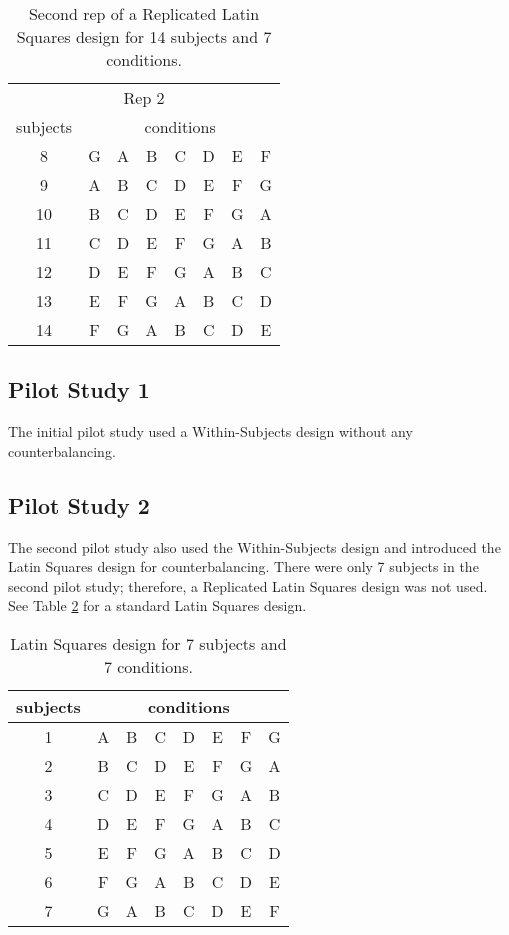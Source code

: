 \begin{table}[h] %
\centering
\caption[Latin Squares Design Rep 2]{\centering Second rep of a Replicated Latin Squares design for 14 subjects and 7 conditions.}
\label{table_latin_squares_rep_2}
\begin{tabular}{c | c c c c c c c}
    \hline
    \multicolumn{8}{c}{Rep 2} \\
    subjects & \multicolumn{7}{c}{conditions} \\
    \hline
    8 & G & A & B & C & D & E & F \\
    9 & A & B & C & D & E & F & G \\
    10 & B & C & D & E & F & G & A \\
    11 & C & D & E & F & G & A & B \\
    12 & D & E & F & G & A & B & C \\
    13 & E & F & G & A & B & C & D \\
    14 & F & G & A & B & C & D & E \\
    \hline
\end{tabular}
\end{table}

\subsection{Pilot Study 1}

The initial pilot study used a Within-Subjects design without any counterbalancing.

\subsection{Pilot Study 2}

The second pilot study also used the Within-Subjects design and introduced the Latin Squares design for counterbalancing. There were only 7 subjects in the second pilot study; therefore, a Replicated Latin Squares design was not used. See Table \ref{table_latin_squares_no_reps} for a standard Latin Squares design.

\begin{table}[h] %
\centering
\caption[Latin Squares Design with No Replications]{\centering Latin Squares design for 7 subjects and 7 conditions.}
\label{table_latin_squares_no_reps}
\begin{tabular}{c | c c c c c c c}
    \hline
    subjects & \multicolumn{7}{c}{conditions} \\
    \hline
    1 & A & B & C & D & E & F & G \\
    2 & B & C & D & E & F & G & A \\
    3 & C & D & E & F & G & A & B \\
    4 & D & E & F & G & A & B & C \\
    5 & E & F & G & A & B & C & D \\
    6 & F & G & A & B & C & D & E \\
    7 & G & A & B & C & D & E & F \\
    \hline
\end{tabular}
\end{table}

